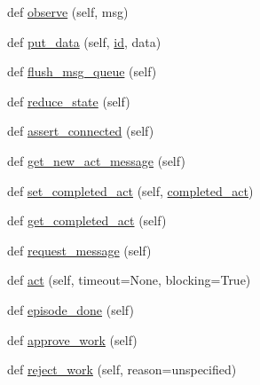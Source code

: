 \begin{DoxyCompactItemize}
def \hyperlink{classparlai_1_1mturk_1_1core_1_1dev_1_1agents_1_1MTurkAgent_af54df523a8cda0a7ed82f7d1e2c5af4b}{observe} (self, msg)
\item 
def \hyperlink{classparlai_1_1mturk_1_1core_1_1dev_1_1agents_1_1MTurkAgent_a2cd8f8cbd48123595dd64371577f2a27}{put\+\_\+data} (self, \hyperlink{classparlai_1_1mturk_1_1core_1_1dev_1_1agents_1_1MTurkAgent_a7043c25b96597aa3621e1db10ea2cf4a}{id}, data)
\item 
def \hyperlink{classparlai_1_1mturk_1_1core_1_1dev_1_1agents_1_1MTurkAgent_ac7a88bfcda18d7ac1862e09042cf6bd6}{flush\+\_\+msg\+\_\+queue} (self)
\item 
def \hyperlink{classparlai_1_1mturk_1_1core_1_1dev_1_1agents_1_1MTurkAgent_ade350517a74213389452642c625bc612}{reduce\+\_\+state} (self)
\item 
def \hyperlink{classparlai_1_1mturk_1_1core_1_1dev_1_1agents_1_1MTurkAgent_a9761bfc34d22aae02017a258276dfaa8}{assert\+\_\+connected} (self)
\item 
def \hyperlink{classparlai_1_1mturk_1_1core_1_1dev_1_1agents_1_1MTurkAgent_aab8cc8a2bb337300bd39709702e68cff}{get\+\_\+new\+\_\+act\+\_\+message} (self)
\item 
def \hyperlink{classparlai_1_1mturk_1_1core_1_1dev_1_1agents_1_1MTurkAgent_a165678febc290547dfdbcf03eda747ba}{set\+\_\+completed\+\_\+act} (self, \hyperlink{classparlai_1_1mturk_1_1core_1_1dev_1_1agents_1_1MTurkAgent_a7f552df348f725e022bc6d5ece942d49}{completed\+\_\+act})
\item 
def \hyperlink{classparlai_1_1mturk_1_1core_1_1dev_1_1agents_1_1MTurkAgent_a81c9e542c8ee09cf424c172f3fd00af2}{get\+\_\+completed\+\_\+act} (self)
\item 
def \hyperlink{classparlai_1_1mturk_1_1core_1_1dev_1_1agents_1_1MTurkAgent_aac39e834ecff137bc0cfbb584c4d6c7f}{request\+\_\+message} (self)
\item 
def \hyperlink{classparlai_1_1mturk_1_1core_1_1dev_1_1agents_1_1MTurkAgent_a398631dd8ea8c0960fc9adc8edb0e08b}{act} (self, timeout=None, blocking=True)
\item 
def \hyperlink{classparlai_1_1mturk_1_1core_1_1dev_1_1agents_1_1MTurkAgent_afd7f0e409db68b1f61b3a82f3c05cee1}{episode\+\_\+done} (self)
\item 
def \hyperlink{classparlai_1_1mturk_1_1core_1_1dev_1_1agents_1_1MTurkAgent_adb726f0723f56988385241a17068bea6}{approve\+\_\+work} (self)
\item 
def \hyperlink{classparlai_1_1mturk_1_1core_1_1dev_1_1agents_1_1MTurkAgent_a5f3d74f332376039cd349ab7159e0b4c}{reject\+\_\+work} (self, reason=\textquotesingle{}unspecified\textquotesingle{})

\end{DoxyCompactItemize}
